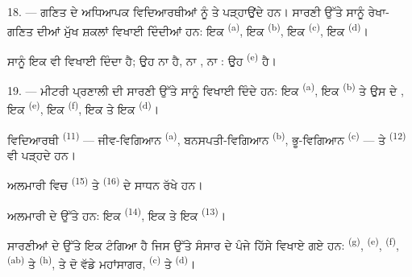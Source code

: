 18. --- ਗਣਿਤ ਦੇ ਅਧਿਆਪਕ ਵਿਦਿਆਰਥੀਆਂ ਨੂੰ  ਤੇ
 ਪੜ੍ਹਾਉਂਦੇ ਹਨ। ਸਾਰਣੀ ਉੱਤੇ ਸਾਨੂੰ ਰੇਖਾ-ਗਣਿਤ ਦੀਆਂ ਮੁੱਖ
ਸ਼ਕਲਾਂ ਵਿਖਾਈ ਦਿੰਦੀਆਂ ਹਨ: ਇਕ  \textsuperscript{(a)}, ਇਕ
 \textsuperscript{(b)}, ਇਕ  \textsuperscript{(c)}, ਇਕ
 \textsuperscript{(d)}।

ਸਾਨੂੰ ਇਕ  ਵੀ ਵਿਖਾਈ ਦਿੰਦਾ ਹੈ; ਉਹ ਨਾ  ਹੈ, ਨਾ
, ਨਾ : ਉਹ  \textsuperscript{(e)} ਹੈ।

19. --- ਮੀਟਰੀ ਪ੍ਰਣਾਲੀ ਦੀ ਸਾਰਣੀ ਉੱਤੇ ਸਾਨੂੰ ਵਿਖਾਈ ਦਿੰਦੇ ਹਨ: ਇਕ 
\textsuperscript{(a)}, ਇਕ  \textsuperscript{(b)} ਤੇ ਉਸ ਦੇ
, ਇਕ  \textsuperscript{(e)}, ਇਕ 
\textsuperscript{(f)}, ਇਕ  ਤੇ ਇਕ 
\textsuperscript{(d)}।

ਵਿਦਿਆਰਥੀ  \textsuperscript{(11)} --- ਜੀਵ-ਵਿਗਿਆਨ
\textsuperscript{(a)}, ਬਨਸਪਤੀ-ਵਿਗਿਆਨ \textsuperscript{(b)}, ਭੂ-ਵਿਗਿਆਨ
\textsuperscript{(c)} --- ਤੇ  \textsuperscript{(12)} ਵੀ ਪੜ੍ਹਦੇ ਹਨ।

ਅਲਮਾਰੀ ਵਿਚ  \textsuperscript{(15)} ਤੇ 
\textsuperscript{(16)} ਦੇ ਸਾਧਨ ਰੱਖੇ ਹਨ।

ਅਲਮਾਰੀ ਦੇ ਉੱਤੇ ਹਨ: ਇਕ  \textsuperscript{(14)}, ਇਕ  ਤੇ
ਇਕ  \textsuperscript{(13)}।

ਸਾਰਣੀਆਂ ਦੇ ਉੱਤੇ ਇਕ  ਟੰਗਿਆ ਹੈ ਜਿਸ ਉੱਤੇ ਸੰਸਾਰ ਦੇ ਪੰਜੇ ਹਿੱਸੇ ਵਿਖਾਏ
ਗਏ ਹਨ:  \textsuperscript{(g)}, 
\textsuperscript{(e)},  \textsuperscript{(f)}, 
\textsuperscript{(ab)} ਤੇ  \textsuperscript{(h)}, ਤੇ ਦੋ ਵੱਡੇ
ਮਹਾਂਸਾਗਰ,  \textsuperscript{(c)} ਤੇ 
\textsuperscript{(d)}।
\VUsaut{6.0mm}
\VUfilet{22mm}
